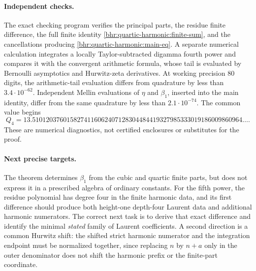 \paragraph{Independent checks.}
The exact checking program verifies the principal parts, the residue
finite difference, the full finite identity
\eqref{bhr:quartic-harmonic:finite-sum}, and the cancellations producing
\eqref{bhr:quartic-harmonic:main-eq}. A separate numerical calculation
integrates a locally Taylor-subtracted digamma fourth power and compares
it with the convergent arithmetic formula, whose tail is evaluated by
Bernoulli asymptotics and Hurwitz-zeta derivatives. At working precision
80 digits, the arithmetic-tail evaluation differs from quadrature by
less than $3.4\cdot10^{-62}$. Independent Mellin evaluations of $\eta$
and $\beta_1$, inserted into the main identity, differ from the same
quadrature by less than $2.1\cdot10^{-74}$. The common value begins
\[
 Q_4=13.5101203760158274116062407128304484419327985333019186009860964\ldots.
\]
These are numerical diagnostics, not certified enclosures or substitutes
for the proof.

\paragraph{Next precise targets.}
The theorem determines $\beta_1$ from the cubic and quartic finite parts,
but does not express it in a prescribed algebra of ordinary constants.
For the fifth power, the residue polynomial has degree four in the
finite harmonic data, and its first difference should produce both
height-one depth-four Laurent data and additional harmonic numerators.
The correct next task is to derive that exact difference and identify the
minimal \emph{stated} family of Laurent coefficients. A second direction
is a common Hurwitz shift: the shifted strict harmonic numerator and the
integration endpoint must be normalized together, since replacing
$n$ by $n+a$ only in the outer denominator does not shift the harmonic
prefix or the finite-part coordinate.
